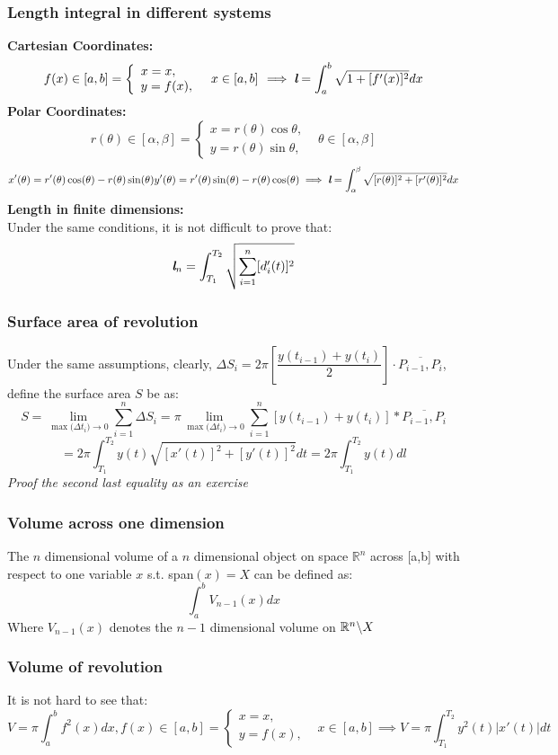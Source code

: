 \documentclass{article}
\newcommand{\0}{{\bf{0}}}
\begin{document}
\subsubsection{Length integral in different systems}
{\bf{Cartesian Coordinates:}}
$$f(x)\in[a,b]=\left\{
        \begin{array}{ll}
             x=x,&\\
             y=f(x),&
        \end{array}
    x\in[a,b]
    \right.\implies{\textit{\textbf{l}}}=\int_a^b\sqrt{1+[f'(x)]^2}dx$$
{\bf{Polar Coordinates:}}
$$r(\theta)\in[\alpha,\beta]=\left\{
        \begin{array}{ll}
             x=r(\theta)\cos{\theta},&\\
             y=r(\theta)\sin{\theta},&
        \end{array}
    \theta\in[\alpha,\beta]
    \right.$$
$$x'(\theta)=r'(\theta)\cos(\theta)-r(\theta)\sin(\theta) y'(\theta)=r'(\theta)\sin(\theta)-r(\theta)\cos(\theta)\implies{\textit{\textbf{l}}}=\int_{\alpha}^{\beta}\sqrt{[r(\theta)]^2+[r'(\theta)]^2}dx$$
{\bf{Length in finite dimensions:}}\\
Under the same conditions, it is not difficult to prove that:$$\textit{\textbf{l}}_n=\int_{T_1}^{T_2}\sqrt{\sum_{i=1}^{n}[d_i'(t)]^2}$$
\subsubsection{Surface area of revolution}
Under the same assumptions, clearly, $\Delta S_i=2\pi\left[\dfrac{y(t_{i-1})+y(t_i)}{2}\right]\cdot\overline{P_{i-1},P_i}$, define the surface area $S$ be as:
$$S=\lim_{\max({\Delta{t}_i)}\to0}\sum_{i=1}^n\Delta S_i=\pi\lim_{\max({\Delta{t}_i)}\to0}\sum_{i=1}^n[y(t_{i-1})+y(t_i)]*\overline{P_{i-1},P_i}$$
$$=2\pi\int_{T_1}^{T_2}y(t)\sqrt{[x'(t)]^2+[y'(t)]^2}dt=2\pi\int_{T_1}^{T_2}y(t)dl$$
\null\hfill\textit{Proof the second last equality as an exercise}
\subsubsection{Volume across one dimension}
The $n$ dimensional volume of a $n$ dimensional object on space $\mathbb{R}^n$ across [a,b] with respect to one variable $x$ s.t. span$(x)=X$ can be defined as:
$$\int_a^bV_{n-1}(x)dx$$
Where $V_{n-1}(x)$ denotes the $n-1$ dimensional volume on $\mathbb{R}^n\symbol{92}X$
\subsubsection{Volume of revolution}
It is not hard to see that:
$$V=\pi\int_a^bf^2(x)dx,f(x)\in[a,b]=\left\{
        \begin{array}{ll}
             x=x,&\\
             y=f(x),&
        \end{array}
    x\in[a,b]
    \right.\implies{V}=\pi\int_{T_1}^{T_2}y^2(t)|x'(t)|dt$$
\end{document}
